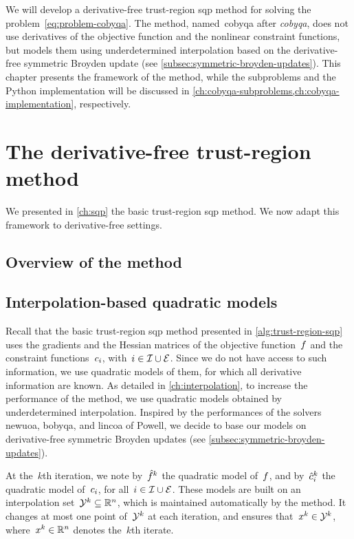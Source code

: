 We will develop a derivative-free trust-region \gls{sqp} method for solving the problem~\cref{eq:problem-cobyqa}.
The method, named~\gls{cobyqa} after \emph{\glsdesc{cobyqa}}, does not use derivatives of the objective function and the nonlinear constraint functions, but models them using underdetermined interpolation based on the derivative-free symmetric Broyden update (see \cref{subsec:symmetric-broyden-updates}).
This chapter presents the framework of the method, while the subproblems and the Python implementation will be discussed in \cref{ch:cobyqa-subproblems,ch:cobyqa-implementation}, respectively.

\section{The derivative-free trust-region  method}

We presented in \cref{ch:sqp} the basic trust-region \gls{sqp} method.
We now adapt this framework to derivative-free settings.

\subsection{Overview of the method}

\subsection{Interpolation-based quadratic models}

Recall that the basic trust-region \gls{sqp} method presented in \cref{alg:trust-region-sqp} uses the gradients and the Hessian matrices of the objective function~$f$ and the constraint functions~$c_{i}$, with~$i \in \mathcal{I} \cup \mathcal{E}$.
Since we do not have access to such information, we use quadratic models of them, for which all derivative information are known.
As detailed in \cref{ch:interpolation}, to increase the performance of the method, we use quadratic models obtained by underdetermined interpolation.
Inspired by the performances of the solvers \gls{newuoa}, \gls{bobyqa}, and \gls{lincoa} of Powell, we decide to base our models on derivative-free symmetric Broyden updates (see \cref{subsec:symmetric-broyden-updates}).

At the~$k$th iteration, we note by~$\objm[k]$ the quadratic model of~$f$, and by~$\conm[k]{i}$ the quadratic model of~$c_{i}$, for all~$i \in \mathcal{I} \cup \mathcal{E}$.
These models are built on an interpolation set~$\xpt[k] \subseteq \R^n$, which is maintained automatically by the method.
It changes at most one point of~$\xpt[k]$ at each iteration, and ensures that~$\iter[k] \in \xpt[k]$, where~$\iter[k] \in \R^n$ denotes the~$k$th iterate. 

